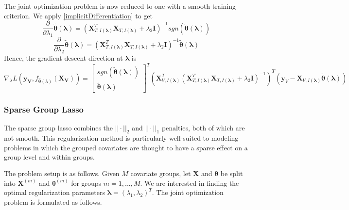 \documentclass[10pt,letterpaper]{article}
\begin{document}
The joint optimization problem is now reduced to one with a smooth training criterion. We apply \eqref{implicitDifferentiation} to get
\begin{equation}
\frac{\partial}{\partial \lambda_1} \tilde{\boldsymbol{\theta}}(\boldsymbol{\lambda}) =
(\boldsymbol{X}_{T, I(\boldsymbol\lambda)}^T \boldsymbol{X}_{T, I(\boldsymbol\lambda)} + \lambda_2 \boldsymbol{I})^{-1}
sgn \left (\tilde{\boldsymbol{\theta}} (\boldsymbol{\lambda}) \right )
\end{equation}
\begin{equation}
\frac{\partial}{\partial \lambda_2} \tilde{\boldsymbol{\theta}}(\boldsymbol{\lambda}) = (\boldsymbol{X}_{T, I(\boldsymbol\lambda)}^T\boldsymbol{X}_{T, I(\boldsymbol\lambda)} + \lambda_2 \boldsymbol{I})^{-1}\tilde{\boldsymbol{\theta}} (\boldsymbol{\lambda})
\end{equation}
Hence, the gradient descent direction at $\boldsymbol{\lambda}$ is
\begin{equation}
\nabla_{\lambda} L(\boldsymbol{y_V}, f_{\hat{\boldsymbol{\theta}}(\lambda)}(\boldsymbol{X_V})) =
\begin{bmatrix}
sgn(\tilde{\boldsymbol{\theta}} (\boldsymbol{\lambda}))\\
\tilde{\boldsymbol{\theta}} (\boldsymbol{\lambda})
\end{bmatrix}^T
(\boldsymbol{X}_{V, I(\boldsymbol\lambda)}^T(\boldsymbol{X}_{T, I(\boldsymbol\lambda)}^T \boldsymbol{X}_{T, I(\boldsymbol\lambda)} + \lambda_2 \boldsymbol{I})^{-1})^T
(\boldsymbol y_V - \boldsymbol{X}_{V, I(\boldsymbol\lambda)} \tilde{\boldsymbol{\theta}} (\boldsymbol{\lambda}))
\end{equation}

\subsubsection{Sparse Group Lasso}

The sparse group lasso combines the $||\cdot||_2$ and $||\cdot||_1$ penalties, both of which are not smooth. This regularization method is particularly well-suited to modeling problems in which the grouped covariates are thought to have a sparse effect on a group level and within groups.

The problem setup is as follows. Given $M$ covariate groups, let $\boldsymbol{X}$ and $\boldsymbol \theta$ be split into $\boldsymbol{X}^{(m)}$ and $\boldsymbol \theta^{(m)}$ for groups $m = 1, ... , M$. We are interested in finding the optimal regularization parameters $\boldsymbol{\lambda} = (\lambda_1, \lambda_2)^T$. The joint optimization problem is formulated as follows.
\end{document}
